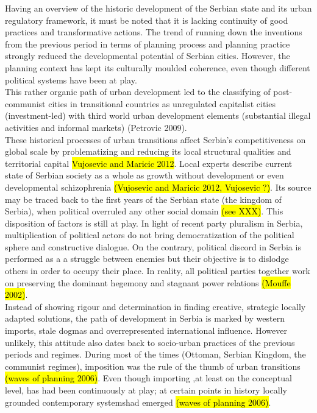 \documentclass[11pt]{report}
\begin{document}
Having an overview of the historic development of the Serbian state and its urban regulatory framework, it must be noted that it is lacking continuity of good practices and transformative actions. The trend of running down the inventions from the previous period in terms of planning process and planning practice strongly reduced the developmental potential of Serbian cities\cite{ref Peric 2016}. However, the planning context has kept its culturally moulded coherence, even though different political systems have been at play.
\\    
This rather organic path of urban development led to the classifying of post-communist cities in transitional countries as unregulated capitalist cities (investment-led) with third world urban development elements (substantial illegal activities and informal markets) (Petrovic 2009).
\\ 
These historical processes of urban transitions affect Serbia's competitiveness on global scale by problematizing and reducing its local structural qualities and territorial capital \hl{Vujosevic and Maricic 2012}. Local experts describe current state of Serbian society as a whole as growth without development or even developmental schizophrenia \hl{(Vujosevic and Maricic 2012, Vujosevic ?)}.
Its source may be traced back to the first years of the Serbian state (the kingdom of Serbia), when political overruled any other social domain \hl{(see XXX)}. This disposition of factors is still at play. In light of recent party pluralism in Serbia, multiplication of political actors do not bring democratization of the political sphere and constructive dialogue. On the contrary, political discord in Serbia is performed as a a struggle between enemies but their objective is to dislodge others in order to occupy their place. In reality, all political parties together work on preserving the dominant hegemony and stagnant power relations \hl{(Mouffe 2002)}.
\\
Instead of showing rigour and determination in finding creative, strategic locally adapted solutions, the path of development in Serbia is marked by western imports, stale dogmas and overrepresented international influence. However unlikely, this attitude also dates back to socio-urban practices of the previous periods and regimes. During most of the times (Ottoman, Serbian Kingdom, the communist regimes), imposition was the rule of the thumb of urban transitions \hl{(waves of planning 2006)}. Even though importing ,at least on the conceptual level, has had been continuously at play; at certain points in history locally grounded contemporary systems\footnotemark had emerged \hl{(waves of planning 2006)}.
\end{document}
